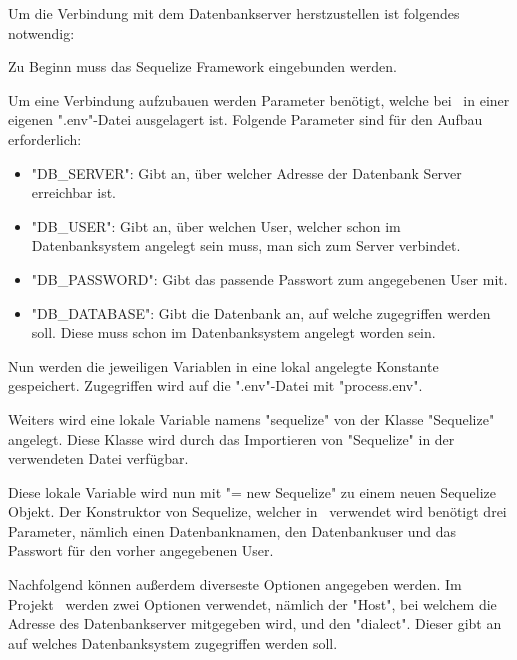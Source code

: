 

Um die Verbindung mit dem Datenbankserver herstzustellen ist folgendes notwendig:

Zu Beginn muss das Sequelize Framework eingebunden werden.


Um eine Verbindung aufzubauen werden Parameter benötigt, welche bei \ZELIA\ in einer eigenen ".env"-Datei ausgelagert ist. Folgende Parameter sind für den Aufbau erforderlich:

\begin{itemize}
    \item "DB\_SERVER": Gibt an, über welcher Adresse der Datenbank Server erreichbar ist.
    \item "DB\_USER": Gibt an, über welchen User, welcher schon im Datenbanksystem angelegt sein muss, man sich zum Server verbindet.
    \item "DB\_PASSWORD": Gibt das passende Passwort zum angegebenen User mit.
    \item "DB\_DATABASE": Gibt die Datenbank an, auf welche zugegriffen werden soll. Diese muss schon im Datenbanksystem angelegt worden sein.
\end{itemize}

Nun werden die jeweiligen Variablen in eine lokal angelegte Konstante gespeichert. Zugegriffen wird auf die ".env"-Datei mit "{\ttfamily process.env}".


Weiters wird eine lokale Variable namens "sequelize" von der Klasse "Sequelize" angelegt. Diese Klasse wird durch das Importieren von "Sequelize" in der verwendeten Datei verfügbar.


Diese lokale Variable wird nun mit "{\ttfamily = new Sequelize}" zu einem neuen Sequelize Objekt. Der Konstruktor von Sequelize, welcher in \ZELIA\ verwendet wird benötigt drei Parameter, nämlich einen Datenbanknamen, den Datenbankuser und das Passwort für den vorher angegebenen User. 

Nachfolgend können außerdem diverseste Optionen angegeben werden. Im Projekt \ZELIA\ werden zwei Optionen verwendet, nämlich der "Host", bei welchem die Adresse des Datenbankserver mitgegeben wird, und den "dialect". Dieser gibt an auf welches Datenbanksystem zugegriffen werden soll.

